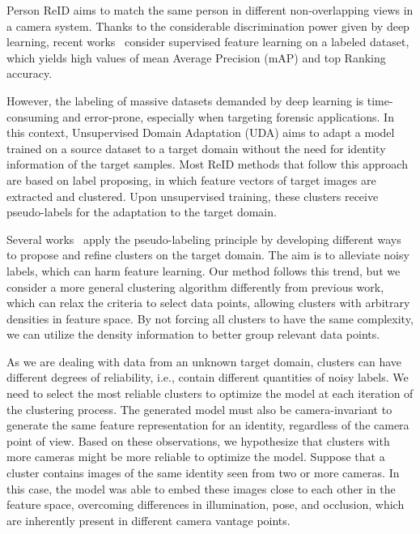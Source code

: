 \documentclass[journal]{IEEEtran}
\begin{document}
Person ReID aims to match the same person in different non-overlapping views in a camera system. Thanks to the considerable discrimination power given by deep learning, recent works~\cite{qian2017multi, sun2018beyond, zhou2019omni, chen2020salience, liu2020unity} consider supervised feature learning on a labeled dataset, which yields high values of mean Average Precision (mAP) and top Ranking accuracy.\par

However, the labeling of massive datasets demanded by deep learning is time-consuming and error-prone, especially when targeting forensic applications. In this context, Unsupervised Domain Adaptation (UDA) aims to adapt a model trained on a source dataset to a target domain without the need for identity information of the target samples. Most ReID methods that follow this approach are based on label proposing, in which feature vectors of target images are extracted and clustered. Upon unsupervised training, these clusters receive pseudo-labels for the adaptation to the target domain. 

Several works~\cite{fan2018unsupervised, song2020unsupervised, fu2019self, zhang2019self, zhai2020ad} apply the pseudo-labeling principle by developing different ways to propose and refine clusters on the target domain. The aim is to alleviate noisy labels, which can harm feature learning. Our method follows this trend, but we consider a more general clustering algorithm differently from previous work, which can relax the criteria to select data points, allowing clusters with arbitrary densities in feature space. By not forcing all clusters to have the same complexity, we can utilize the density information to better group relevant data points.

As we are dealing with data from an unknown target domain, clusters can have different degrees of reliability, i.e., contain different quantities of noisy labels. We need to select the most reliable clusters to optimize the model at each iteration of the clustering process. The generated model must also be camera-invariant to generate the same feature representation for an identity, regardless of the camera point of view. Based on these observations, we hypothesize that clusters with more cameras might be more reliable to optimize the model. Suppose that a cluster contains images of the same identity seen from two or more cameras. In this case, the model was able to embed these images close to each other in the feature space, overcoming differences in illumination, pose, and occlusion, which are inherently present in different camera vantage points. 
\end{document}
